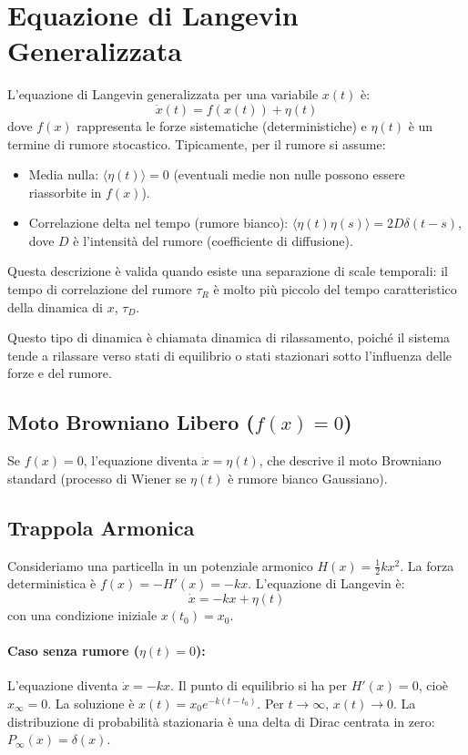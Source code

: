 \section{Equazione di Langevin Generalizzata}
L'equazione di Langevin generalizzata per una variabile $x(t)$ è:
\begin{equation}
\dot{x}(t) = f(x(t)) + \eta(t)
\end{equation}
dove $f(x)$ rappresenta le forze sistematiche (deterministiche) e $\eta(t)$ è un termine di rumore stocastico. Tipicamente, per il rumore si assume:
\begin{itemize}
    \item Media nulla: $\langle\eta(t)\rangle=0$ (eventuali medie non nulle possono essere riassorbite in $f(x)$).
    \item Correlazione delta nel tempo (rumore bianco): $\langle\eta(t)\eta(s)\rangle=2D\delta(t-s)$, dove $D$ è l'intensità del rumore (coefficiente di diffusione).
\end{itemize}

Questa descrizione è valida quando esiste una separazione di scale temporali: il tempo di correlazione del rumore $\tau_R$ è molto più piccolo del tempo caratteristico della dinamica di $x$, $\tau_D$.

Questo tipo di dinamica è chiamata dinamica di rilassamento, poiché il sistema tende a rilassare verso stati di equilibrio o stati stazionari sotto l'influenza delle forze e del rumore.

\subsection{Moto Browniano Libero ($f(x)=0$)}
Se $f(x)=0$, l'equazione diventa $\dot{x}=\eta(t)$, che descrive il moto Browniano standard (processo di Wiener se $\eta(t)$ è rumore bianco Gaussiano).

\subsection{Trappola Armonica}
Consideriamo una particella in un potenziale armonico $H(x)=\frac{1}{2}kx^{2}$. La forza deterministica è $f(x) = -H'(x) = -kx$. L'equazione di Langevin è:
\begin{equation}
\dot{x}=-kx+\eta(t)
\end{equation}
con una condizione iniziale $x(t_0)=x_0$.

\paragraph{Caso senza rumore ($\eta(t)=0$):}
L'equazione diventa $\dot{x}=-kx$. Il punto di equilibrio si ha per $H'(x)=0$, cioè $x_{\infty}=0$. La soluzione è $x(t)=x_{0}e^{-k(t-t_0)}$. Per $t\rightarrow\infty$, $x(t)\rightarrow 0$. La distribuzione di probabilità stazionaria è una delta di Dirac centrata in zero: $P_{\infty}(x)=\delta(x)$.

